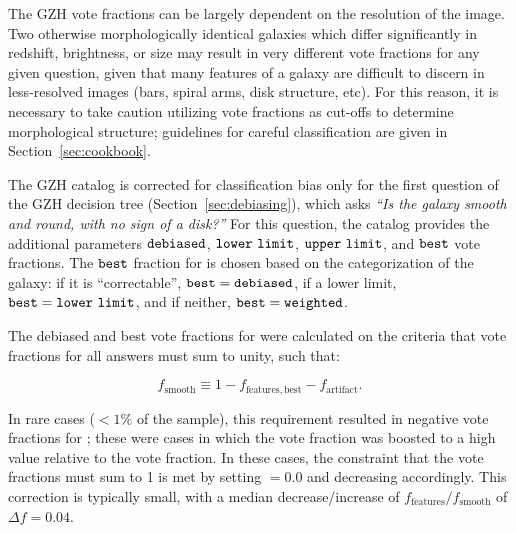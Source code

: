 \documentclass[twocolumn]{aastex6}
\begin{document}
The GZH vote fractions can be largely dependent on the resolution of the image. Two otherwise morphologically identical galaxies which differ significantly in redshift, brightness, or size may result in very different vote fractions for any given question, given that many features of a galaxy are difficult to discern in less-resolved images (bars, spiral arms, disk structure, etc). For this reason, it is necessary to take caution utilizing vote fractions as cut-offs to determine morphological structure; guidelines for careful classification are given in Section~\ref{sec:cookbook}. 

The GZH catalog is corrected for classification bias only for the first question of the GZH decision tree (Section~\ref{sec:debiasing}), which asks {\it ``Is the galaxy smooth and round, with no sign of a disk?''} For this question, the catalog provides the additional parameters $\tt debiased$, $\tt lower~limit$, $\tt upper~limit$, and $\tt best$ vote fractions. The $\tt best$ fraction for \ffeatures{} is chosen based on the categorization of the galaxy: if it is ``correctable'', $\tt best = debiased$, if a lower limit, $\tt best = lower~limit$, and if neither, $\tt best = weighted$. 

The debiased and best vote fractions for \fsmooth{} were calculated on the criteria that vote fractions for all answers must sum to unity, such that:

\begin{equation}
f_\mathrm{smooth} \equiv 1 - f_\mathrm{features,best} - f_\mathrm{artifact}.
\label{eqn:nonlinear}
\end{equation}

\noindent In rare cases ($<1\%$ of the sample), this requirement resulted in negative vote fractions for \fsmooth; these were cases in which the \ffeatures{} vote fraction was boosted to a high value relative to the \fartifact{} vote fraction. In these cases, the constraint that the vote fractions must sum to 1 is met by setting \fsmooth$=0.0$ and decreasing \fbest{} accordingly. This correction is typically small, with a median decrease/increase of $f_\mathrm{features}/f_\mathrm{smooth}$ of $\Delta f = 0.04$.
\end{document}
